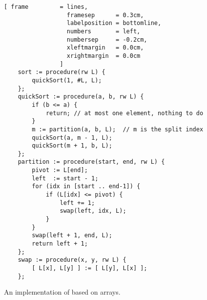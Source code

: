 \begin{figure}[!ht]
  \centering
\begin{Verbatim}[ frame         = lines, 
                  framesep      = 0.3cm, 
                  labelposition = bottomline,
                  numbers       = left,
                  numbersep     = -0.2cm,
                  xleftmargin   = 0.0cm,
                  xrightmargin  = 0.0cm
                ]
    sort := procedure(rw L) {
        quickSort(1, #L, L);
    };
    quickSort := procedure(a, b, rw L) {
        if (b <= a) {
            return; // at most one element, nothing to do
        }
        m := partition(a, b, L);  // m is the split index
        quickSort(a, m - 1, L);
        quickSort(m + 1, b, L);
    };
    partition := procedure(start, end, rw L) {
        pivot := L[end];
        left  := start - 1;
        for (idx in [start .. end-1]) {
            if (L[idx] <= pivot) {
                left += 1;
                swap(left, idx, L);
            }
        }
        swap(left + 1, end, L);
        return left + 1;
    };
    swap := procedure(x, y, rw L) {
        [ L[x], L[y] ] := [ L[y], L[x] ];
    };
\end{Verbatim}
\vspace*{-0.3cm}
  \caption{An implementation of  based on arrays.}
  \label{fig:quick-sort-array.stlx}
\end{figure}

